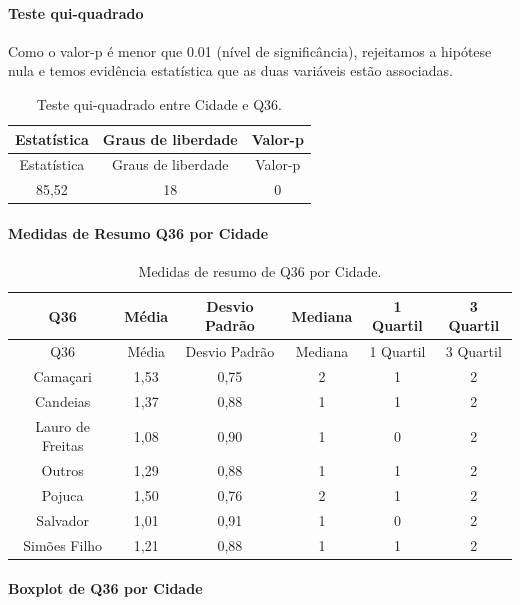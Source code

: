 \documentclass[]{article}
\let\oldparagraph\paragraph
\renewcommand{\paragraph}[1]{\oldparagraph{#1}\mbox{}}
\begin{document}
\hypertarget{teste-qui-quadrado-112}{%
\paragraph{Teste qui-quadrado}\label{teste-qui-quadrado-112}}

Como o valor-p é menor que 0.01 (nível de significância), rejeitamos a hipótese nula e temos evidência estatística que as duas variáveis estão associadas.

\begin{longtable}[]{@{}ccc@{}}
\caption{\label{tab:unnamed-chunk-1313}Teste qui-quadrado entre Cidade e Q36.}\tabularnewline
\toprule
Estatística & Graus de liberdade & Valor-p\tabularnewline
\midrule
\endfirsthead
\toprule
Estatística & Graus de liberdade & Valor-p\tabularnewline
\midrule
\endhead
85,52 & 18 & 0\tabularnewline
\bottomrule
\end{longtable}

\cleardoublepage

\hypertarget{medidas-de-resumo-q36-por-cidade}{%
\paragraph{Medidas de Resumo Q36 por Cidade}\label{medidas-de-resumo-q36-por-cidade}}

\begin{longtable}[]{@{}cccccc@{}}
\caption{\label{tab:unnamed-chunk-1314}Medidas de resumo de Q36 por Cidade.}\tabularnewline
\toprule
Q36 & Média & Desvio Padrão & Mediana & 1 Quartil & 3 Quartil\tabularnewline
\midrule
\endfirsthead
\toprule
Q36 & Média & Desvio Padrão & Mediana & 1 Quartil & 3 Quartil\tabularnewline
\midrule
\endhead
Camaçari & 1,53 & 0,75 & 2 & 1 & 2\tabularnewline
Candeias & 1,37 & 0,88 & 1 & 1 & 2\tabularnewline
Lauro de Freitas & 1,08 & 0,90 & 1 & 0 & 2\tabularnewline
Outros & 1,29 & 0,88 & 1 & 1 & 2\tabularnewline
Pojuca & 1,50 & 0,76 & 2 & 1 & 2\tabularnewline
Salvador & 1,01 & 0,91 & 1 & 0 & 2\tabularnewline
Simões Filho & 1,21 & 0,88 & 1 & 1 & 2\tabularnewline
\bottomrule
\end{longtable}

\hypertarget{boxplot-de-q36-por-cidade}{%
\paragraph{Boxplot de Q36 por Cidade}\label{boxplot-de-q36-por-cidade}}
\end{document}
